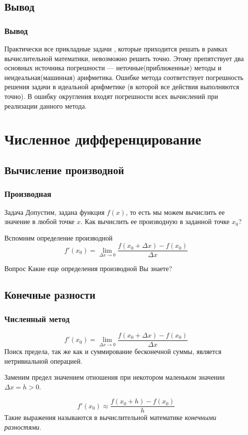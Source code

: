 \documentclass[aspectratio=43,unicode]{beamer}
\begin{document}
\subsection{Вывод}
\begin{frame}
\frametitle{Вывод}
{
	Практически все прикладные задачи , которые приходится решать в рамках вычислительной математики, невозможно решить точно.
	Этому препятствует два основных источника погрешности --- неточные(приближенные) методы и неидеальная(машинная) арифметика.
	Ошибке метода соответствует погрешность решения задачи в идеальной арифметике (в которой все действия выполняются точно).
	В ошибку округления входят погрешности всех вычислений при реализации данного метода.
}
\end{frame}

\section{Численное дифференцирование}
\subsection{Вычисление производной}
\begin{frame}
\frametitle{Производная}
	\begin{block}{Задача}
	Допустим, задана функция $f(x)$, то есть мы можем вычислить ее значение в любой точке $x$.
	Как вычислить ее производную в заданной точке $x_0$?
	\end{block}
	\pause
	Вспомним определение производной
	\[
	f'(x_0) = \lim_{\Delta x \rightarrow 0} \frac{f(x_0+\Delta x) -
	f(x_0)}{\Delta x}
	\]
	\begin{block}{Вопрос}
	Какие еще определения производной Вы знаете?
	\end{block}
\end{frame}

\subsection{Конечные разности}
\begin{frame}
\frametitle{Численный метод}
	\[
	f'(x_0) = \lim_{\Delta x \rightarrow 0} \frac{f(x_0+\Delta x) - f(x_0)}{\Delta x}
	\]
	Поиск предела, так же как и суммирование бесконечной суммы, является нетривиальной операцией.

	\pause
	Заменим предел значением отношения при некотором маленьком значении $\Delta x = h > 0$.

	\[
	f'(x_0) \approx \frac{f(x_0+h) - f(x_0)}{h}
	\]
	Такие выражения называются в вычислительной математике \emph{конечными
	разностями}.
\end{frame}
\end{document}
